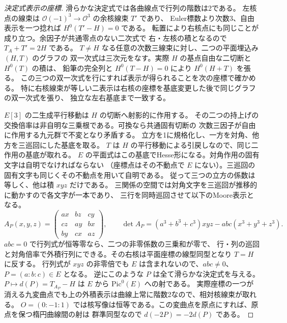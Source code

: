 \begin{proof}[決定式表示の座標]
滑らかな決定式では各曲線点で行列の階数は2である。
左核点の線束は $\mathcal O(-1)^3\to\mathcal O^3$ の余核線束 $T'$ であり、
Euler標数より次数3、自由表示を一つ捻れば $H^0(T'-H)=0$ である。
転置により右核点にも同じことが成り立つ。余因子が共通零点のない二次式で
右・左核の積となるので $T_A+T'=2H$ である。
$T\ne H$ なる任意の次数三線束に対し、二つの平面埋込み $(H,T)$ のグラフの
双一次式は三次元をなす。実際 $H$ の基点自由な二切断と $H^0(T)$ の積は、
鉛筆の完全列と $H^0(T-H)=0$ により $H^0(H+T)$ を張る。
この三つの双一次式を行にすれば表示が得られることを次の座標で確かめる。
特に右核線束が等しい二表示は右核の座標を基底変更した後で同じグラフの双一次式を張り、
独立な左右基底まで一致する。

$E[3]$ の二生成平行移動は $H$ の切断へ射影的に作用する。
その二つの持上げの交換倍率は非自明な三乗根である。可換なら共通固有切断の
次数三因子が自由に作用する九元群で不変となり矛盾する。
立方を1に規格化し、一方を対角、他方を三巡回にした基底を取る。
$T$ は $H$ の平行移動による引戻しなので、同じ二作用の基底が取れる。
$E$ の平面式はこの基底でHesse形になる。対角作用の固有文字は自明でなければならない
（座標点はその不動点で $E$ にない）。三巡回の固有文字も同じくその不動点を用いて自明である。
従って三つの立方の係数は等しく、他は積 $xyz$ だけである。
三関係の空間では対角文字を三巡回が推移的に動かすので各文字が一本であり、
三行を同時巡回させて以下のMoore表示となる。
\[
 A_P(x,y,z)=\begin{pmatrix}
 a x&b z&c y\\ c z&a y&b x\\ b y&c x&a z
 \end{pmatrix},\qquad
 \det A_P=(a^3+b^3+c^3)xyz-abc(x^3+y^3+z^3).
\]
$abc=0$ で行列式が恒等零なら、二つの非零係数の三乗和が零で、
行・列の巡回と対角倍率で外積行列にできる。その右核は平面座標の線型同型となり $T=H$ に反する。
行列式が $xyz$ の非零倍でも $E$ は含まれないので、$abc\ne0$、$P=(a:b:c)\in E$ となる。
逆にこのような $P$ は全て滑らかな決定式を与える。
$P\mapsto d(P)=T_{A_P}-H$ は $E$ から $\mathrm{Pic}^0(E)$ への射である。
実際座標の一つが消える九変曲点でも上の外積表示は曲線上常に階数2なので、相対核線束が取れる。
$O=(0:-1:1)$ では核写像は恒等である。この変曲点を原点にすれば、原点を保つ楕円曲線間の射は
群準同型なので $d(-2P)=-2d(P)$ である。
\end{proof}


